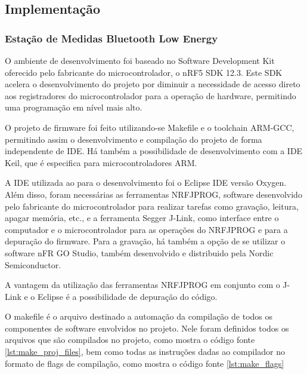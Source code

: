 
\subsection{Implementação}

\subsubsection{Estação de Medidas Bluetooth Low Energy}



O ambiente de desenvolvimento foi baseado no Software Development Kit oferecido
pelo fabricante do microcontrolador, o nRF5 SDK 12.3. Este SDK acelera o
desenvolvimento do projeto por diminuir a necessidade de acesso direto aos
registradores do microcontrolador para a operação de hardware, permitindo uma
programação em nível mais alto.
 
O projeto de firmware foi feito utilizando-se Makefile e o toolchain ARM-GCC,
permitindo assim o desenvolvimento e compilação do projeto de forma
independente de IDE. Há também a possibilidade de desenvolvimento com a IDE
Keil, que é especifica para microcontroladores ARM. 

A IDE utilizada ao para o desenvolvimento foi o Eclipse IDE versão Oxygen. Além
disso, foram necessárias as ferramentas NRFJPROG, software desenvolvido pelo
fabricante do microcontrolador para realizar tarefas como gravação, leitura,
apagar memória, etc., e a ferramenta Segger J-Link, como interface entre o
computador e o microcontrolador para as operações do NRFJPROG e para a
depuração do firmware. Para a gravação, há também a opção de se utilizar o
software nFR GO Studio, também desenvolvido e distribuido pela Nordic
Semiconductor.

A vantagem da utilização das ferramentas NRFJPROG em conjunto com o J-Link e o
Eclipse é a possibilidade de depuração do código.

O makefile é o arquivo destinado a automação da compilação de todos os
componentes de software envolvidos no projeto. Nele foram definidos todos os
arquivos que são compilados no projeto, como mostra o código fonte
\ref{lst:make_proj_files}, bem como todas as instruções dadas ao compilador no
formato de flags de compilação, como mostra o código fonte \ref{lst:make_flags}

